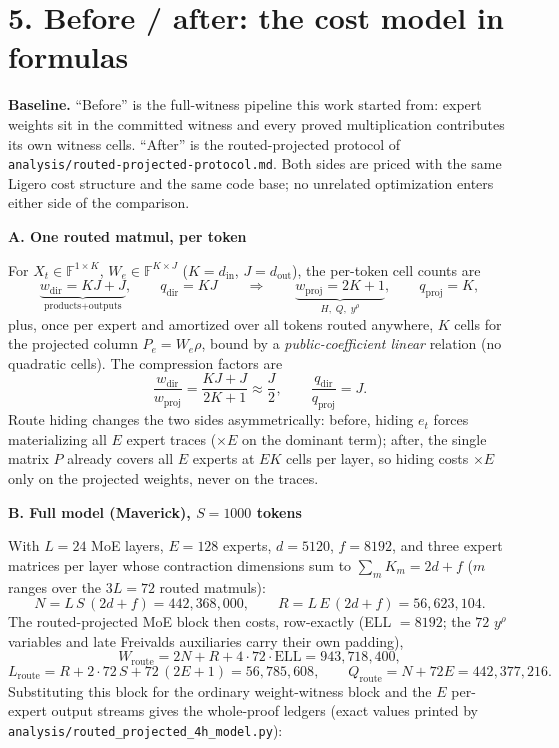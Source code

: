 \documentclass[10pt,a4paper]{article}
\begin{document}
\newpage

\section*{5. Before / after: the cost model in formulas}

\textbf{\color{navy}Baseline.} ``Before'' is the full-witness pipeline this work started from:
expert weights sit in the committed witness and every proved multiplication contributes its own
witness cells. ``After'' is the routed-projected protocol of
\texttt{analysis/routed-projected-protocol.md}. Both sides are priced with the same Ligero cost
structure and the same code base; no unrelated optimization enters either side of the comparison.

{\sffamily\bfseries\color{navy}A. One routed matmul, per token}

For $X_t\in\mathbb F^{1\times K}$, $W_e\in\mathbb F^{K\times J}$
($K=d_{\mathrm{in}}$, $J=d_{\mathrm{out}}$), the per-token cell counts are
\[
\underbrace{w_{\mathrm{dir}}=KJ+J}_{\text{products}+\text{outputs}},\qquad
q_{\mathrm{dir}}=KJ
\qquad\Longrightarrow\qquad
\underbrace{w_{\mathrm{proj}}=2K+1}_{H,\;Q,\;y^\rho},\qquad
q_{\mathrm{proj}}=K,
\]
plus, once per expert and amortized over all tokens routed anywhere, $K$ cells for the projected
column $P_e=W_e\rho$, bound by a \emph{public-coefficient linear} relation (no quadratic cells).
The compression factors are
\[
\frac{w_{\mathrm{dir}}}{w_{\mathrm{proj}}}=\frac{KJ+J}{2K+1}\approx\frac{J}{2},
\qquad
\frac{q_{\mathrm{dir}}}{q_{\mathrm{proj}}}=J .
\]
Route hiding changes the two sides asymmetrically: before, hiding $e_t$ forces materializing all
$E$ expert traces ($\times E$ on the dominant term); after, the single matrix $P$ already covers
all $E$ experts at $EK$ cells per layer, so hiding costs $\times E$ only on the projected weights,
never on the traces.

{\sffamily\bfseries\color{navy}B. Full model (Maverick), $S=1000$ tokens}

With $L=24$ MoE layers, $E=128$ experts, $d=5120$, $f=8192$, and three expert matrices per layer
whose contraction dimensions sum to $\sum_m K_m=2d+f$ ($m$ ranges over the $3L=72$ routed matmuls):
\[
N=L\,S\,(2d+f)=442{,}368{,}000,
\qquad
R=L\,E\,(2d+f)=56{,}623{,}104 .
\]
The routed-projected MoE block then costs, row-exactly (ELL $=8192$; the $72$ $y^\rho$ variables
and late Freivalds auxiliaries carry their own padding),
\[
W_{\mathrm{route}}=2N+R+4\cdot72\cdot\mathrm{ELL}=943{,}718{,}400,
\]
\[
L_{\mathrm{route}}=R+2\cdot72\,S+72\,(2E+1)=56{,}785{,}608,
\qquad
Q_{\mathrm{route}}=N+72E=442{,}377{,}216 .
\]
Substituting this block for the ordinary weight-witness block and the $E$ per-expert output
streams gives the whole-proof ledgers (exact values printed by
\texttt{analysis/routed\_projected\_4h\_model.py}):
\end{document}
